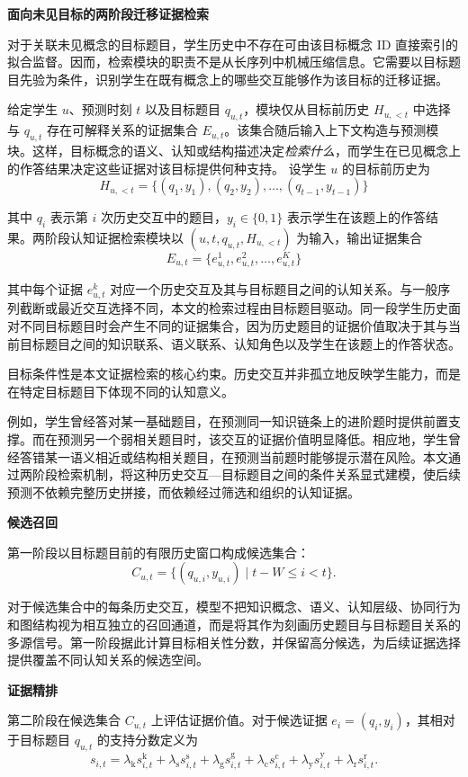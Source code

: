 \documentclass[UTF8,a4paper,12pt]{ctexart}
\numberwithin{table}{section}
\begin{document}
\noindent\textbf{面向未见目标的两阶段迁移证据检索}



对于关联未见概念的目标题目，学生历史中不存在可由该目标概念 ID 直接索引的拟合监督。因而，检索模块的职责不是从长序列中机械压缩信息。它需要以目标题目先验为条件，识别学生在既有概念上的哪些交互能够作为该目标的迁移证据。

给定学生 \(u\)、预测时刻 \(t\) 以及目标题目 \(q_{u,t}\)，模块仅从目标前历史 \(H_{u,<t}\) 中选择与 \(q_{u,t}\) 存在可解释关系的证据集合 \(E_{u,t}\)。该集合随后输入上下文构造与预测模块。这样，目标概念的语义、认知或结构描述决定\emph{检索什么}，而学生在已见概念上的作答结果决定这些证据对该目标提供何种支持。
设学生 \(u\) 的目标前历史为
\[
H_{u,<t}=\{(q_1,y_1),(q_2,y_2),\ldots,(q_{t-1},y_{t-1})\}
\]

其中 \(q_i\) 表示第 \(i\) 次历史交互中的题目，\(y_i\in\{0,1\}\) 表示学生在该题上的作答结果。两阶段认知证据检索模块以 \((u,t,q_{u,t},H_{u,<t})\) 为输入，输出证据集合
\[
E_{u,t}=\{e_{u,t}^{1},e_{u,t}^{2},\ldots,e_{u,t}^{K}\}
\]

其中每个证据 \(e_{u,t}^{k}\) 对应一个历史交互及其与目标题目之间的认知关系。与一般序列截断或最近交互选择不同，本文的检索过程由目标题目驱动。同一段学生历史面对不同目标题目时会产生不同的证据集合，因为历史题目的证据价值取决于其与当前目标题目之间的知识联系、语义联系、认知角色以及学生在该题上的作答状态。

目标条件性是本文证据检索的核心约束。历史交互并非孤立地反映学生能力，而是在特定目标题目下体现不同的认知意义。

例如，学生曾经答对某一基础题目，在预测同一知识链条上的进阶题时提供前置支撑。而在预测另一个弱相关题目时，该交互的证据价值明显降低。相应地，学生曾经答错某一语义相近或结构相关题目，在预测当前题时能够提示潜在风险。本文通过两阶段检索机制，将这种历史交互—目标题目之间的条件关系显式建模，使后续预测不依赖完整历史拼接，而依赖经过筛选和组织的认知证据。

\noindent\textbf{候选召回}

第一阶段以目标题目前的有限历史窗口构成候选集合：
\[
C_{u,t}=\{(q_{u,i},y_{u,i})\mid t-W\leq i<t\}.
\]

对于候选集合中的每条历史交互，模型不把知识概念、语义、认知层级、协同行为和图结构视为相互独立的召回通道，而是将其作为刻画历史题目与目标题目关系的多源信号。第一阶段据此计算目标相关性分数，并保留高分候选，为后续证据选择提供覆盖不同认知关系的候选空间。

\noindent\textbf{证据精排}

第二阶段在候选集合 \(C_{u,t}\) 上评估证据价值。对于候选证据 \(e_i=(q_i,y_i)\)，其相对于目标题目 \(q_{u,t}\) 的支持分数定义为
\[
s_{i,t}=\lambda_{\mathrm{k}}s^{\mathrm{k}}_{i,t}+\lambda_{\mathrm{s}}s^{\mathrm{s}}_{i,t}+\lambda_{\mathrm{g}}s^{\mathrm{g}}_{i,t}+\lambda_{\mathrm{c}}s^{\mathrm{c}}_{i,t}+\lambda_{\mathrm{y}}s^{\mathrm{y}}_{i,t}+\lambda_{\mathrm{r}}s^{\mathrm{r}}_{i,t}.
\]
\end{document}
